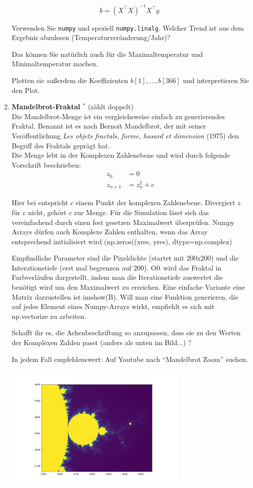 \begin{enumerate}[1.]
\[ b = (X^\top X)^{-1} X^\top y  \; \]

Verwenden Sie \texttt{numpy} und speziell \texttt{numpy.linalg}.
Welcher Trend ist aus dem Ergebnis abzulesen (Temperaturveränderung/Jahr)?

Das können Sie natürlich auch für die Maximaltemperatur und  Minimaltemperatur
machen.

Plotten sie außerdem die Koeffizienten $b[1],\ldots,b[366]$ und interpretieren
Sie den Plot.

\item \textbf{Mandelbrot-Fraktal $^*$} (zählt doppelt)\\
Die Mandelbrot-Menge ist ein vergleichsweise einfach zu generierendes Fraktal. Benannt ist es nach Bernoit Mandelbrot, der mit seiner Veröffentlichung \textit{Les objets fractals, forme, hasard et dimension} (1975) den Begriff des Fraktals geprägt hat.\\
Die Menge lebt in der Komplexen Zahlenebene und wird durch folgende Vorschrift beschrieben:
\begin{align*}
z_0 &= 0 \\
z_{n+1} &= z_n^2 + c
\end{align*}

Hier bei entspricht $c$ einem Punkt der komplexen Zahlenebene. Divergiert $z$ für $c$ nicht, gehört $c$ zur Menge. Für die Simulation lässt sich das vereinfachend durch einen fest gesetzen Maximalwert überprüfen. Numpy Arrays dürfen auch Komplexe Zahlen enthalten, wenn das Array entsprechend initialisiert wird (np.zeros((xres, yres), dtype=np.complex\textunderscore)

Empfindliche Parameter sind die Pixeldichte (startet mit 200x200) und die Interationstiefe (erst mal begrenzen auf 200). Oft wird das Fraktal in Farbverläufen dargestellt, indem man die Iterationstiefe auswertet die benötigt wird um den Maximalwert zu erreichen. Eine einfache Variante eine Matrix darzustellen ist imshow(B). Will man eine Funktion generieren, die auf jedes Element eines Numpy-Arrays wirkt, empfiehlt es sich mit np.vectorize zu arbeiten.

Schafft ihr es, die Achenbeschriftung so anzupassen, dass sie zu den Werten der Komplexen Zahlen passt (anders als unten im Bild...) ?

In jedem Fall empfehlenswert: Auf Youtube nach ``Mandelbrot Zoom'' suchen.

\includegraphics[width=0.7\textwidth]{mandelbrot_andrea.png}\hfill%




\end{enumerate}

